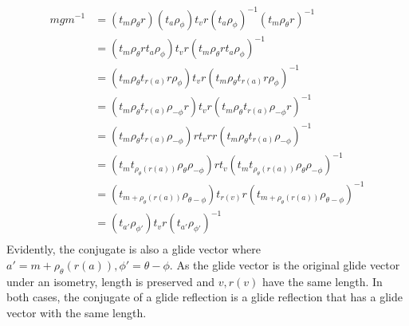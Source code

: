 \documentclass{article}
\begin{document}
\begin{equation}
    \begin{split}
        mgm^{-1} & = \left(t_m\rho_{\theta}r\right)\left(t_a\rho_{\phi}\right)t_vr\left(t_a\rho_{\phi}\right)^{-1}\left(t_m\rho_{\theta}r\right)^{-1} \\
        & = \left(t_m\rho_{\theta}rt_a\rho_{\phi}\right)t_vr\left(t_m\rho_{\theta}rt_a\rho_{\phi}\right)^{-1} \\
        & = \left(t_m\rho_{\theta}t_{r\left(a\right)}r\rho_{\phi}\right)t_vr\left(t_m\rho_{\theta}t_{r\left(a\right)}r\rho_{\phi}\right)^{-1} \\
        & = \left(t_m\rho_{\theta}t_{r\left(a\right)}\rho_{-\phi}r\right)t_vr\left(t_m\rho_{\theta}t_{r\left(a\right)}\rho_{-\phi}r\right)^{-1} \\
        & = \left(t_m\rho_{\theta}t_{r\left(a\right)}\rho_{-\phi}\right)rt_vrr\left(t_m\rho_{\theta}t_{r\left(a\right)}\rho_{-\phi}\right)^{-1} \\
        & = \left(t_mt_{\rho_{\theta}\left(r\left(a\right)\right)}\rho_{\theta}\rho_{-\phi}\right)rt_v\left(t_mt_{\rho_{\theta}\left(r\left(a\right)\right)}\rho_{\theta}\rho_{-\phi}\right)^{-1} \\
        & = \left(t_{m + \rho_{\theta}\left(r\left(a\right)\right)}\rho_{\theta - \phi}\right)t_{r\left(v\right)}r\left(t_{m + \rho_{\theta}\left(r\left(a\right)\right)}\rho_{\theta - \phi}\right)^{-1} \\
        & = \left(t_{a'}\rho_{\phi'}\right)t_vr\left(t_{a'}\rho_{\phi'}\right)^{-1} \\
    \end{split}
\end{equation}
Evidently, the conjugate is also a glide vector where $a' = m + \rho_{\theta}\left(r\left(a\right)\right), \phi' = \theta - \phi$. As the glide vector is the original glide vector under an isometry, length is preserved and $v, r\left(v\right)$ have the same length. In both cases, the conjugate of a glide reflection is a glide reflection that has a glide vector with the same length.

\newpage
\end{document}
